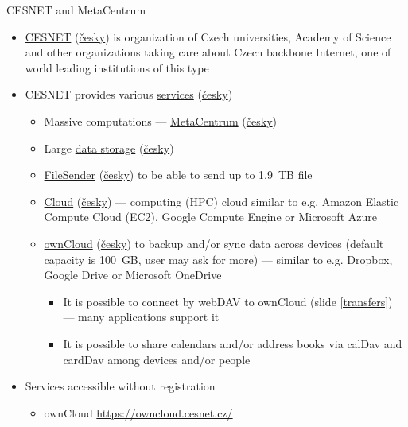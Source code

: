 \documentclass[compress, xelatex, 11pt, xcolor=svgnames, aspectratio=169,
	hyperref={
		bookmarks=true,
		unicode=true,
		colorlinks=true,
		pdftitle={Linux, command line and MetaCentrum},
		plainpages=false,
		pdfauthor={Vojtech Zeisek},
		pdfsubject={Course about use of Linux command line, writing shell scripts and using MetaCentrum of CESNET},
		pdfcreator={XeLaTeX},
		pdfkeywords={Linux, GNU, BASH, shell, command line, MetaCentrum},
		linkcolor=DarkRed, %
		anchorcolor=DarkBlue, %
		citecolor=Indigo, %
		filecolor=NavyBlue, %
		menucolor=DarkMagenta, %
		urlcolor=DarkBlue, %
		},
	url={hyphens, lowtilde} %
	]{beamer}
\begin{document}
\begin{frame}[allowframebreaks]{CESNET and MetaCentrum}
	\label{CESNET}
	\begin{itemize}
		\item \href{https://www.cesnet.cz/?lang=en}{CESNET} (\href{https://www.cesnet.cz/}{česky}) is organization of Czech universities, Academy of Science and other organizations taking care about Czech backbone Internet, one of world leading institutions of this type
		\item CESNET provides various \href{https://www.cesnet.cz/services/?lang=en}{services} (\href{https://www.cesnet.cz/sluzby/}{česky})
		\begin{itemize}
			\item Massive computations --- \href{https://www.cesnet.cz/services/massive-computations-metacentrum/?lang=en}{MetaCentrum} (\href{https://www.cesnet.cz/sluzby/metacentrum/}{česky})
			\item Large \href{https://www.cesnet.cz/services/data-storage/?lang=en}{data storage} (\href{https://www.cesnet.cz/sluzby/datova-uloziste/}{česky})
			\item \href{https://www.cesnet.cz/services/filesender/?lang=en}{FileSender} (\href{https://www.cesnet.cz/sluzby/filesender/}{česky}) to be able to send up to 1.9~TB file
			\item \href{https://www.metacentrum.cz/en/Sluzby/Cloud/}{Cloud} (\href{https://www.metacentrum.cz/cs/Sluzby/Cloud/}{česky}) --- computing (HPC) cloud similar to e.g. Amazon Elastic Compute Cloud (EC2), Google Compute Engine or Microsoft Azure
			\item \href{https://www.cesnet.cz/services/owncloud/?lang=en}{ownCloud} (\href{https://www.cesnet.cz/sluzby/owncloud/}{česky}) to backup and/or sync data across devices (default capacity is 100~GB, user may ask for more) --- similar to e.g. Dropbox, Google Drive or Microsoft OneDrive
			\begin{itemize}
				\item It is possible to connect by webDAV to ownCloud (slide \ref{transfers}) --- many applications support it
				\item It is possible to share calendars and/or address books via calDav and cardDav among devices and/or people
			\end{itemize}
		\end{itemize}
		\item Services accessible without registration
		\begin{itemize}
			\item ownCloud \url{https://owncloud.cesnet.cz/}

\end{itemize}
\end{itemize}
\end{frame}
\end{document}

